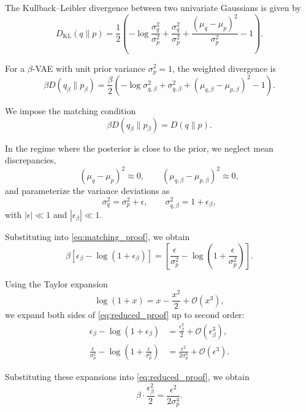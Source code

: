 \documentclass[twoside,11pt]{article}
\renewenvironment{proof}{\par\noindent{\bf Proof\ }}{\hfill\BlackBox\par\vspace{2mm}}
\begin{document}
\begin{proof}
The Kullback–Leibler divergence between two univariate Gaussians is given by
\begin{equation}
\label{eq:kl_general_proof}
D_{\mathrm{KL}}(q\|p)
=
\frac{1}{2}
\left(
-\log \frac{\sigma_q^2}{\sigma_p^2}
+
\frac{\sigma_q^2}{\sigma_p^2}
+
\frac{(\mu_q-\mu_p)^2}{\sigma_p^2}
-1
\right).
\end{equation}

For a $\beta$-VAE with unit prior variance $\sigma_p^2 = 1$, the weighted divergence is
\begin{equation}
\label{eq:kl_beta_proof}
\beta D(q_\beta\|p_\beta)
=
\frac{\beta}{2}
\left(
-\log \sigma_{q,\beta}^2
+
\sigma_{q,\beta}^2
+
(\mu_{q,\beta}-\mu_{p,\beta})^2
-1
\right).
\end{equation}

We impose the matching condition
\begin{equation}
\beta D(q_\beta\|p_\beta) = D(q\|p).
\label{eq:matching_proof}
\end{equation}

In the regime where the posterior is close to the prior, we neglect mean discrepancies,
\[
(\mu_q-\mu_p)^2 \approx 0,
\qquad
(\mu_{q,\beta}-\mu_{p,\beta})^2 \approx 0,
\]
and parameterize the variance deviations as
\[
\sigma_q^2 = \sigma_p^2 + \epsilon,
\qquad
\sigma_{q,\beta}^2 = 1 + \epsilon_\beta,
\]
with $|\epsilon| \ll 1$ and $|\epsilon_\beta| \ll 1$.

Substituting into \eqref{eq:matching_proof}, we obtain
\begin{equation}
\beta\left[
\epsilon_\beta - \log(1+\epsilon_\beta)
\right]
=
\left[
\frac{\epsilon}{\sigma_p^2}
-
\log\left(1+\frac{\epsilon}{\sigma_p^2}\right)
\right].
\label{eq:reduced_proof}
\end{equation}

Using the Taylor expansion
\[
\log(1+x) = x - \frac{x^2}{2} + \mathcal{O}(x^3),
\]
we expand both sides of \eqref{eq:reduced_proof} up to second order:
\begin{align*}
\epsilon_\beta - \log(1+\epsilon_\beta)
&= \frac{\epsilon_\beta^2}{2} + \mathcal{O}(\epsilon_\beta^3), \\
\frac{\epsilon}{\sigma_p^2} - \log\left(1+\frac{\epsilon}{\sigma_p^2}\right)
&= \frac{\epsilon^2}{2\sigma_p^4} + \mathcal{O}(\epsilon^3).
\end{align*}

Substituting these expansions into \eqref{eq:reduced_proof}, we obtain
\[
\beta \cdot \frac{\epsilon_\beta^2}{2}
=
\frac{\epsilon^2}{2\sigma_p^4}.
\]


\end{proof}
\end{document}
